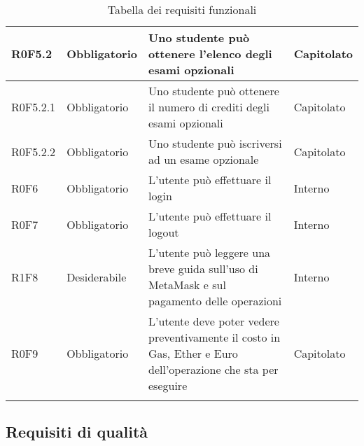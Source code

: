 \documentclass[AnalisiDeiRequisiti.tex]{subfiles}
\begin{document}
\begin{longtable}[H]{|p{2.5cm}|p{2.5cm}|p{5cm}|p{2cm}|}
	R0F5.2 & Obbligatorio & Uno studente può ottenere l'elenco degli esami opzionali & Capitolato \\ \hline
	R0F5.2.1 & Obbligatorio & Uno studente può ottenere il numero di crediti degli esami opzionali & Capitolato \\ \hline
	R0F5.2.2 & Obbligatorio & Uno studente può iscriversi ad un esame opzionale & Capitolato \\ \hline
	R0F6 & Obbligatorio & L'utente può effettuare il login & Interno \\ \hline
	R0F7 & Obbligatorio & L'utente può effettuare il logout & Interno \\ \hline
	R1F8 & Desiderabile & L'utente può leggere una breve guida sull'uso di MetaMask e sul pagamento delle operazioni & Interno \\ \hline %
	R0F9 & Obbligatorio & L'utente deve poter vedere preventivamente il costo in Gas, Ether e Euro dell'operazione che sta per eseguire & Capitolato \\ \hline	
	\caption{Tabella dei requisiti funzionali}
\end{longtable}

\subsection{Requisiti di qualità}
\end{document}
